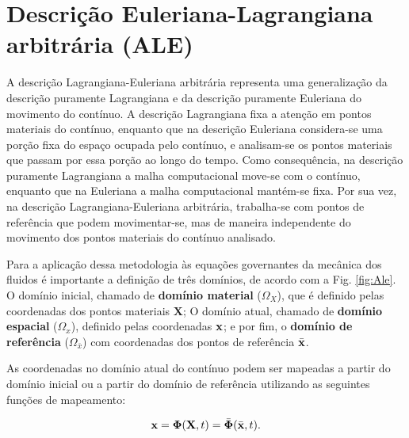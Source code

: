 \documentclass[tese_patricia]{subfiles}%
\begin{document}
\section{Descrição Euleriana-Lagrangiana arbitrária (ALE)}

A descrição Lagrangiana-Euleriana arbitrária \cite{DoneaGH:1982} representa uma generalização da descrição puramente Lagrangiana e da descrição puramente Euleriana do movimento do contínuo. A descrição Lagrangiana fixa a atenção em pontos materiais do contínuo, enquanto que na descrição Euleriana considera-se uma porção fixa do espaço ocupada pelo contínuo, e analisam-se os pontos materiais que passam por essa porção ao longo do tempo. Como consequência, na descrição puramente Lagrangiana a malha computacional move-se com o contínuo, enquanto que na Euleriana a malha computacional mantém-se fixa. Por sua vez, na descrição Lagrangiana-Euleriana arbitrária, trabalha-se com pontos de referência que podem movimentar-se, mas de maneira independente do movimento dos pontos materiais do contínuo analisado.

Para a aplicação dessa metodologia às equações governantes da mecânica dos fluidos é importante a definição de três domínios, de acordo com a Fig. \ref{fig:Ale}. O domínio inicial, chamado de \textbf{domínio material} ($\Omega_X$), que é definido pelas coordenadas dos pontos materiais $\mathbf{X}$; O domínio atual, chamado de \textbf{domínio espacial} ($\Omega_x$), definido pelas coordenadas $\mathbf{x}$; e por fim, o \textbf{domínio de referência} ($\Omega_{\bar{x}}$) com coordenadas dos pontos de referência $\bar{\mathbf{x}}$. 

As coordenadas no domínio atual do contínuo podem ser mapeadas a partir do domínio inicial ou a partir do domínio de referência utilizando as seguintes funções de mapeamento:  

\begin{align}
\mathbf{x} = \mathbf{\Phi}(\mathbf{X},t) = \bar{\mathbf{\Phi}}(\bar{\mathbf{x}},t). \label{eq:Pos}
\end{align}
\end{document}
